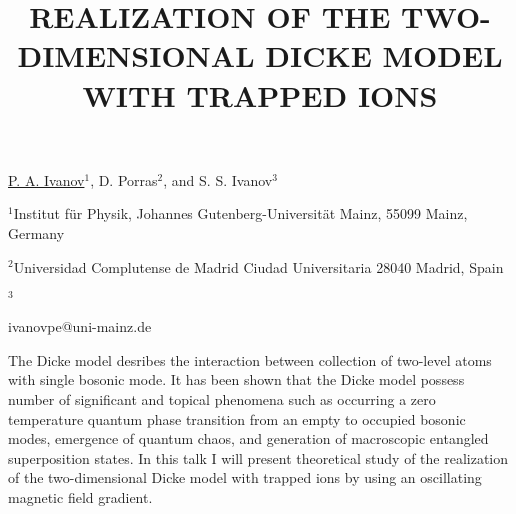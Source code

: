 \title{REALIZATION OF THE TWO-DIMENSIONAL DICKE MODEL WITH TRAPPED IONS}

\underline{P. A. Ivanov}$^{1}$, D. Porras$^{2}$, and S. S. Ivanov$^{3}$

{\normalsize{

\vspace{-4mm} $^1$Institut f\"ur Physik, Johannes
Gutenberg-Universit\"at Mainz, 55099 Mainz, Germany

\vspace{-4mm} $^2$Universidad Complutense de Madrid
Ciudad Universitaria 28040 Madrid, Spain

\vspace{-4mm} $^3$\unisofia

\email ivanovpe@uni-mainz.de}}

The Dicke model desribes the interaction between collection of two-level atoms with single bosonic mode. It has been shown that the Dicke model possess number of significant and topical phenomena such as occurring a zero temperature quantum phase transition from an empty to occupied bosonic modes, emergence of quantum chaos, and generation of macroscopic entangled superposition states. In this talk I will present theoretical study of the realization of the two-dimensional Dicke model with trapped ions by using an oscillating magnetic field gradient.

\vspace{\baselineskip} 